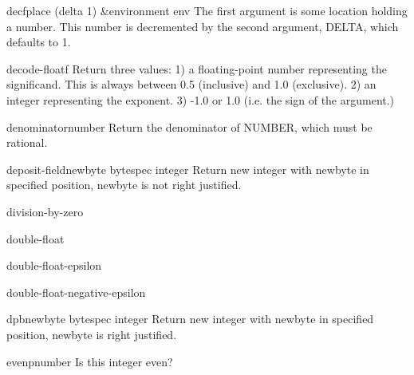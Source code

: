 \begin{macro}{decf}{place \op (delta 1) &environment env}{}
  The first argument is some location holding a number. This number is
  decremented by the second argument, DELTA, which defaults to 1.
\end{macro}

\begin{function}{decode-float}{f}{}
  Return three values:
   1) a floating-point number representing the significand. This is always
      between 0.5 (inclusive) and 1.0 (exclusive).
   2) an integer representing the exponent.
   3) -1.0 or 1.0 (i.e. the sign of the argument.)
\end{function}

\begin{function}{denominator}{number}{}
  Return the denominator of NUMBER, which must be rational.
\end{function}

\begin{function}{deposit-field}{newbyte bytespec integer}{}
  Return new integer with newbyte in specified position, newbyte is not right justified.
\end{function}

\begin{condition-type}{division-by-zero}{}{}
  
\end{condition-type}

\begin{type}{double-float}{}{}
  
\end{type}

\begin{constant}{double-float-epsilon}{}{}
  
\end{constant}

\begin{constant}{double-float-negative-epsilon}{}{}
  
\end{constant}

\begin{function}{dpb}{newbyte bytespec integer}{}
  Return new integer with newbyte in specified position, newbyte is right justified.
\end{function}

\begin{function}{evenp}{number}{}
  Is this integer even?
\end{function}

